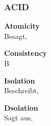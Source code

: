 
\subsubsection{ACID}
\label{ACID}
    \begin{description}
        \item \textbf{Atomicity}\hfill \\Besagt,
        \item \textbf{Consistency}\hfill \\B
        \item \textbf{Isolation}\hfill \\Beschreibt,
        \item \textbf{Dsolation}\hfill \\Sagt aus,
    \end{description}
